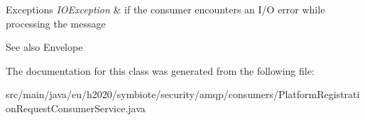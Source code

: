 \begin{DoxyExceptions}{Exceptions}
{\em I\+O\+Exception} & if the consumer encounters an I/O error while processing the message \\
\hline
\end{DoxyExceptions}
\begin{DoxySeeAlso}{See also}
Envelope 
\end{DoxySeeAlso}


The documentation for this class was generated from the following file\+:\begin{DoxyCompactItemize}
\item 
src/main/java/eu/h2020/symbiote/security/amqp/consumers/Platform\+Registration\+Request\+Consumer\+Service.\+java\end{DoxyCompactItemize}
